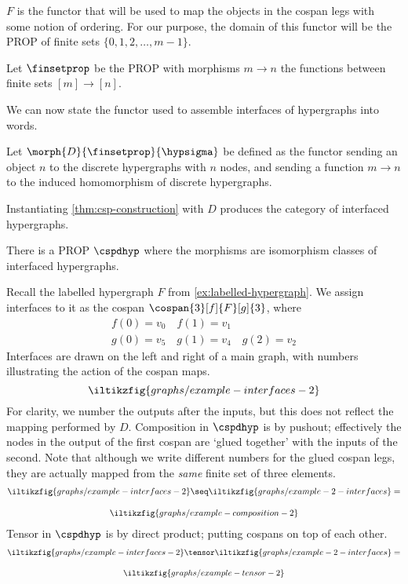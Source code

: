 \(F\) is the functor that will be used to map the objects in the cospan legs
with some notion of ordering.
For our purpose, the domain of this functor will be the PROP of finite sets
\(\{0,1,2,\dots,m-1\}\).

\begin{definition}
    Let \(\finsetprop\) be the PROP with morphisms \(m \to n\) the functions
    between finite sets \([m] \to [n]\).
\end{definition}

We can now state the functor used to assemble interfaces of hypergraphs into
words.

\begin{definition}
    Let \(\morph{D}{\finsetprop}{\hypsigma}\) be defined as the functor sending
    an object \(n\) to the discrete hypergraphs with \(n\) nodes, and sending
    a function \(m \to n\) to the induced homomorphism of discrete
    hypergraphs.
\end{definition}

Instantiating \cref{thm:csp-construction} with \(D\) produces the category of
interfaced hypergraphs.

\begin{corollary}
    There is a PROP \(\cspdhyp\) where the morphisms are isomorphism classes of
    interfaced hypergraphs.
\end{corollary}

\begin{example}
    Recall the labelled hypergraph \(F\) from \cref{ex:labelled-hypergraph}.
    We assign interfaces to it as the cospan \(\cospan{3}[f]{F}[g]{3}\), where
    \begin{gather*}
        f(0) = v_0 \quad f(1) = v_1 \\
        g(0) = v_5 \quad g(1) = v_4 \quad g(2) = v_2
    \end{gather*}
    Interfaces are drawn on the left and right of a main graph, with numbers
    illustrating the action of the cospan maps.
    \[
        \iltikzfig{graphs/example-interfaces-2}
    \]
    For clarity, we number the outputs after the inputs, but this does not
    reflect the mapping performed by \(D\).
    Composition in \(\cspdhyp\) is by pushout; effectively the nodes in the
    output of the first cospan are `glued together' with the inputs of the
    second.
    Note that although we write different numbers for the glued cospan legs,
    they are actually mapped from the \emph{same} finite set of three elements.
    \begin{gather*}
        \iltikzfig{graphs/example-interfaces-2}
        \seq
        \iltikzfig{graphs/example-2-interfaces}
        =\\[1em]
        \iltikzfig{graphs/example-composition-2}
    \end{gather*}
    Tensor in \(\cspdhyp\) is by direct product; putting cospans on top of each
    other.
    \begin{gather*}
        \iltikzfig{graphs/example-interfaces-2}
        \tensor
        \iltikzfig{graphs/example-2-interfaces}
        =\\[1em]
        \iltikzfig{graphs/example-tensor-2}
    \end{gather*}
\end{example}

